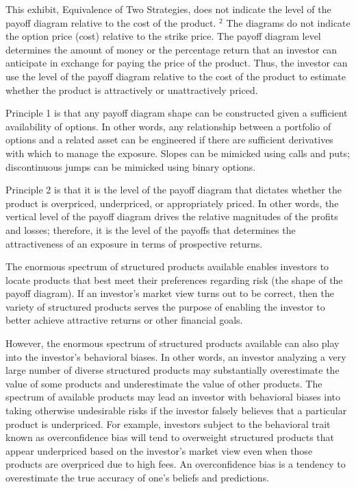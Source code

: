 \documentclass[11pt]{article}
\begin{document}
This exhibit, Equivalence of Two Strategies, does not indicate the level of the payoff diagram relative to the cost of the product. ${ }^{2}$ The diagrams do not indicate the option price (cost) relative to the strike price. The payoff diagram level determines the amount of money or the percentage return that an investor can anticipate in exchange for paying the price of the product. Thus, the investor can use the level of the payoff diagram relative to the cost of the product to estimate whether the product is attractively or unattractively priced.

Principle 1 is that any payoff diagram shape can be constructed given a sufficient availability of options. In other words, any relationship between a portfolio of options and a related asset can be engineered if there are sufficient derivatives with which to manage the exposure. Slopes can be mimicked using calls and puts; discontinuous jumps can be mimicked using binary options.

Principle 2 is that it is the level of the payoff diagram that dictates whether the product is overpriced, underpriced, or appropriately priced. In other words, the vertical level of the payoff diagram drives the relative magnitudes of the profits and losses; therefore, it is the level of the payoffs that determines the attractiveness of an exposure in terms of prospective returns.

The enormous spectrum of structured products available enables investors to locate products that best meet their preferences regarding risk (the shape of the payoff diagram). If an investor's market view turns out to be correct, then the variety of structured products serves the purpose of enabling the investor to better achieve attractive returns or other financial goals.

However, the enormous spectrum of structured products available can also play into the investor's behavioral biases. In other words, an investor analyzing a very large number of diverse structured products may substantially overestimate the value of some products and underestimate the value of other products. The spectrum of available products may lead an investor with behavioral biases into taking otherwise undesirable risks if the investor falsely believes that a particular product is underpriced. For example, investors subject to the behavioral trait known as overconfidence bias will tend to overweight structured products that appear underpriced based on the investor's market view even when those products are overpriced due to high fees. An overconfidence bias is a tendency to overestimate the true accuracy of one's beliefs and predictions.
\end{document}
